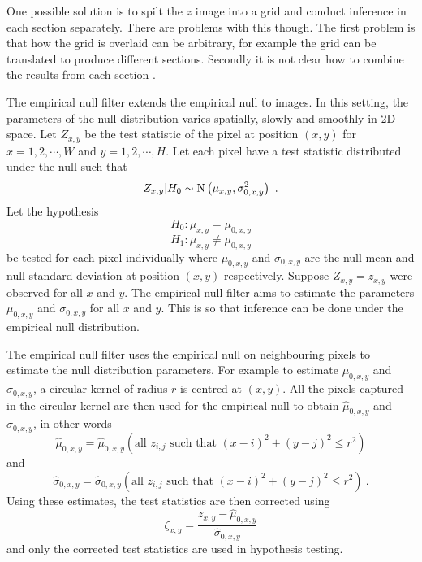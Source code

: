 One possible solution is to spilt the $z$ image into a grid and conduct inference in each section separately. There are problems with this though. The first problem is that how the grid is overlaid can be arbitrary, for example the grid can be translated to produce different sections. Secondly it is not clear how to combine the results from each section \citep{efron2008simultaneous}.

The empirical null filter extends the empirical null to images. In this setting, the parameters of the null distribution varies spatially, slowly and smoothly in 2D space. Let $Z_{x,y}$ be the test statistic of the pixel at position $(x,y)$ for $x=1,2,\cdots,W$ and $y=1,2,\cdots,H$. Let each pixel have a test statistic distributed under the null such that
\begin{equation}
  Z_{x,y}|H_0\sim\operatorname{N}\left(
    \mu_{x,y},\sigma_{0,x,y}^2
  \right)
  \ .
\end{equation}
Let the hypothesis
\begin{equation}
  H_0:\mu_{x,y}=\mu_{0,x,y}
\end{equation}
\begin{equation}
  H_1:\mu_{x,y}\neq\mu_{0,x,y}
\end{equation}
be tested for each pixel individually where $\mu_{0,x,y}$ and $\sigma_{0,x,y}$ are the null mean and null standard deviation at position $(x,y)$ respectively. Suppose $Z_{x,y}=z_{x,y}$ were observed for all $x$ and $y$. The empirical null filter aims to estimate the parameters $\mu_{0,x,y}$ and $\sigma_{0,x,y}$ for all $x$ and $y$. This is so that inference can be done under the empirical null distribution. 

The empirical null filter uses the empirical null on neighbouring pixels to estimate the null distribution parameters. For example to estimate $\mu_{0,x,y}$ and $\sigma_{0,x,y}$, a circular kernel of radius $r$ is centred at $(x,y)$. All the pixels captured in the circular kernel are then used for the empirical null to obtain $\widehat{\mu}_{0,x,y}$ and $\widehat{\sigma}_{0,x,y}$, in other words
\begin{equation}
  \widehat{\mu}_{0,x,y}
  =
  \widehat{\mu}_{0,x,y}
    \left(
      \text{all }z_{i,j}\text{ such that }(x-i)^2+(y-j)^2\leqslant r^2
    \right)
\end{equation}
and
\begin{equation}
  \widehat{\sigma}_{0,x,y}
  =
  \widehat{\sigma}_{0,x,y}
    \left(
      \text{all }z_{i,j}\text{ such that }(x-i)^2+(y-j)^2\leqslant r^2
    \right)
  \ .
\end{equation}
Using these estimates, the test statistics are then corrected using
\begin{equation}
  \zeta_{x,y} = 
  \dfrac{
    z_{x,y}-\widehat{\mu}_{0,x,y}
  }
  {
    \widehat{\sigma}_{0,x,y}
  }
\end{equation}
and only the corrected test statistics are used in hypothesis testing.

